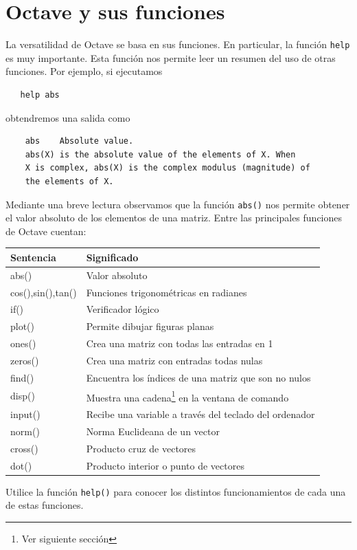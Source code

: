 \documentclass[letter,11pt]{article}
\newcommand\0{\mathbf{0}}
\newcommand{\octave}{{\sc Octave }}
\begin{document}
\section{\octave y sus funciones}
  La versatilidad de \octave se basa en sus funciones. En particular, la funci\'on \texttt{help} es muy importante. Esta funci\'on nos permite leer un resumen del uso de otras funciones. Por ejemplo, si ejecutamos 
  \begin{lstlisting}
   help abs
  \end{lstlisting}
  obtendremos una salida como
  \begin{lstlisting}
    abs    Absolute value.
    abs(X) is the absolute value of the elements of X. When
    X is complex, abs(X) is the complex modulus (magnitude) of
    the elements of X.
  \end{lstlisting}
  Mediante una breve lectura observamos que la funci\'on \texttt{abs()} nos permite obtener el valor absoluto de los elementos de una matriz. Entre las principales funciones de \octave cuentan:
  \begin{center}
      \begin{tabular}{p{5cm}|l}
        \hline
	Sentencia	  & Significado\\
	\hline
       abs()		  & Valor absoluto\\
       cos(),sin(),tan()  & Funciones trigonom\'etricas en radianes\\
       if()		& Verificador l\'ogico\\
       plot()		& Permite dibujar figuras planas\\
       ones()		& Crea una matriz con todas las entradas en 1\\
       zeros()		& Crea una matriz con entradas todas nulas \\
       find()		& Encuentra los \'indices de una matriz que son no nulos\\
       disp()		& Muestra una cadena\footnote{Ver siguiente secci\'on} en la ventana de comando\\
       input()		& Recibe una variable a trav\'es del teclado del ordenador\\
       norm() 		& Norma Euclideana de un vector \\
       cross()		& Producto cruz de vectores \\
       dot()		& Producto interior o punto de vectores
      \end{tabular}
  \end{center}

Utilice la funci\'on \texttt{help()} para conocer los distintos funcionamientos de cada una de estas funciones.
\end{document}
